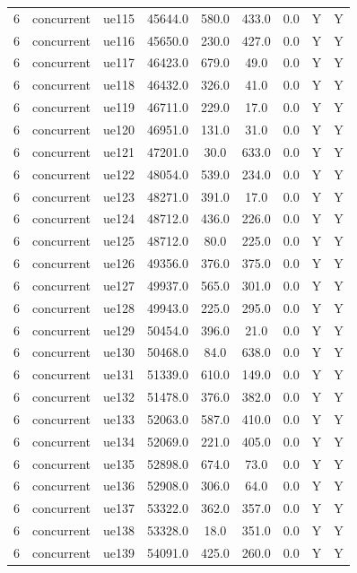 \begin{table}[ht]
\begin{tabular}{|c|c|c|c|c|c|c|c|c|}
6 & concurrent & ue115 & 45644.0 & 580.0 & 433.0 & 0.0 & Y & Y \\
6 & concurrent & ue116 & 45650.0 & 230.0 & 427.0 & 0.0 & Y & Y \\
6 & concurrent & ue117 & 46423.0 & 679.0 & 49.0 & 0.0 & Y & Y \\
6 & concurrent & ue118 & 46432.0 & 326.0 & 41.0 & 0.0 & Y & Y \\
6 & concurrent & ue119 & 46711.0 & 229.0 & 17.0 & 0.0 & Y & Y \\
6 & concurrent & ue120 & 46951.0 & 131.0 & 31.0 & 0.0 & Y & Y \\
6 & concurrent & ue121 & 47201.0 & 30.0 & 633.0 & 0.0 & Y & Y \\
6 & concurrent & ue122 & 48054.0 & 539.0 & 234.0 & 0.0 & Y & Y \\
6 & concurrent & ue123 & 48271.0 & 391.0 & 17.0 & 0.0 & Y & Y \\
6 & concurrent & ue124 & 48712.0 & 436.0 & 226.0 & 0.0 & Y & Y \\
6 & concurrent & ue125 & 48712.0 & 80.0 & 225.0 & 0.0 & Y & Y \\
6 & concurrent & ue126 & 49356.0 & 376.0 & 375.0 & 0.0 & Y & Y \\
6 & concurrent & ue127 & 49937.0 & 565.0 & 301.0 & 0.0 & Y & Y \\
6 & concurrent & ue128 & 49943.0 & 225.0 & 295.0 & 0.0 & Y & Y \\
6 & concurrent & ue129 & 50454.0 & 396.0 & 21.0 & 0.0 & Y & Y \\
6 & concurrent & ue130 & 50468.0 & 84.0 & 638.0 & 0.0 & Y & Y \\
6 & concurrent & ue131 & 51339.0 & 610.0 & 149.0 & 0.0 & Y & Y \\
6 & concurrent & ue132 & 51478.0 & 376.0 & 382.0 & 0.0 & Y & Y \\
6 & concurrent & ue133 & 52063.0 & 587.0 & 410.0 & 0.0 & Y & Y \\
6 & concurrent & ue134 & 52069.0 & 221.0 & 405.0 & 0.0 & Y & Y \\
6 & concurrent & ue135 & 52898.0 & 674.0 & 73.0 & 0.0 & Y & Y \\
6 & concurrent & ue136 & 52908.0 & 306.0 & 64.0 & 0.0 & Y & Y \\
6 & concurrent & ue137 & 53322.0 & 362.0 & 357.0 & 0.0 & Y & Y \\
6 & concurrent & ue138 & 53328.0 & 18.0 & 351.0 & 0.0 & Y & Y \\
6 & concurrent & ue139 & 54091.0 & 425.0 & 260.0 & 0.0 & Y & Y \\

\end{tabular}
\end{table}
